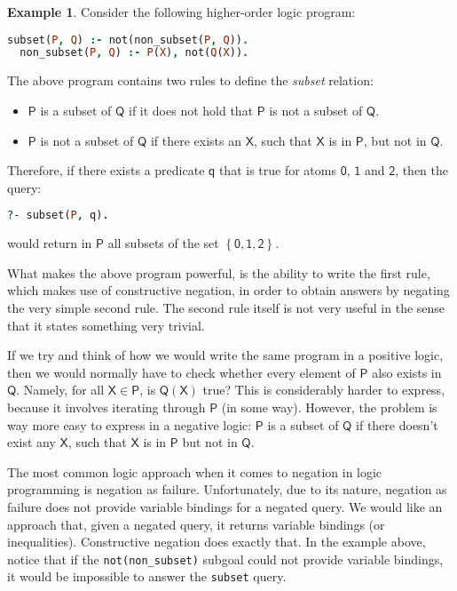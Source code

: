 \documentclass[inscr,ack,preface]{dithesis}
\theoremstyle{definition}
\newtheorem{example}{Example}[chapter]
\newcommand{\msf}[1]{$\mathsf{#1}$}
\begin{document}
\begin{example}\label{ex:subset}
Consider the following higher-order logic program:
\begin{lstlisting}[language=Prolog,frame=single]
  subset(P, Q) :- not(non_subset(P, Q)).
  non_subset(P, Q) :- P(X), not(Q(X)).
\end{lstlisting}
The above program contains two rules to define the \emph{subset} relation:
\begin{itemize}
  \item \msf{P} is a subset of \msf{Q} if it does not hold that \msf{P} is not a subset of \msf{Q}.
  \item \msf{P} is not a subset of \msf{Q} if there exists an \msf{X}, such that \msf{X} is in \msf{P}, but not in \msf{Q}.
\end{itemize}
Therefore, if there exists a predicate \msf{q} that is true for atoms \msf{0}, \msf{1} and \msf{2}, then the query:
\begin{lstlisting}[language=Prolog,frame=single]
  ?- subset(P, q).
\end{lstlisting}
would return in \msf{P} all subsets of the set \msf{\left\{ 0, 1, 2 \right\}}.

What makes the above program powerful, is the ability to write the first rule, which makes use of constructive negation, in order to obtain answers by negating the very simple second rule. The second rule itself is not very useful in the sense that it states something very trivial.

If we try and think of how we would write the same program in a positive logic, then we would normally have to check whether every element of \msf{P} also exists in \msf{Q}. Namely, for all \msf{X \in P}, is \msf{Q(X)} true? This is considerably harder to express, because it involves iterating through \msf{P} (in some way). However, the problem is way more easy to express in a negative logic: \msf{P} is a subset of \msf{Q} if there doesn't exist any \msf{X}, such that \msf{X} is in \msf{P} but not in \msf{Q}.
\end{example}

The most common logic approach when it comes to negation in logic programming is negation as failure. Unfortunately, due to its nature, negation as failure does not provide variable bindings for a negated query. We would like an approach that, given a negated query, it returns variable bindings (or inequalities). Constructive negation does exactly that. In the example above, notice that if the \texttt{not(non\_subset)} subgoal could not provide variable bindings, it would be impossible to answer the \texttt{subset} query.
\end{document}

